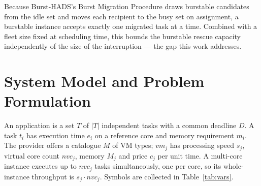 \documentclass[conference]{IEEEtran}
\begin{document}
Because Burst-HADS's Burst Migration Procedure draws burstable candidates from
the idle set and moves each recipient to the busy set on assignment, a burstable
instance accepts exactly one migrated task at a time. Combined with a fleet size
fixed at scheduling time, this bounds the burstable rescue capacity independently
of the size of the interruption --- the gap this work addresses.

\section{System Model and Problem Formulation}

An application is a set $T$ of $|T|$ independent tasks with a common deadline
$D$. A task $t_i$ has execution time $e_i$ on a reference core and memory
requirement $m_i$. The provider offers a catalogue $M$ of VM types; $vm_j$ has
processing speed $s_j$, virtual core count $\mathit{nvc}_j$, memory $M_j$ and
price $c_j$ per unit time. A multi-core instance executes up to $\mathit{nvc}_j$
tasks simultaneously, one per core, so its whole-instance throughput is
$s_j\cdot \mathit{nvc}_j$. Symbols are collected in Table~\ref{tab:vars}.
\end{document}

